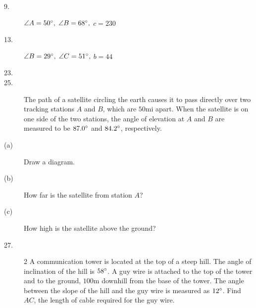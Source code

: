 \begin{description}
\item [9.] $\angle A =50 \mbox{{\ensuremath{{}^\circ}}}\text{,}$ $\angle B =68 \mbox{{\ensuremath{{}^\circ}}}\text{,}$ $c =230$ 

\item [13.] $\angle B =29 \mbox{{\ensuremath{{}^\circ}}}\text{,}$ $\angle C =51 \mbox{{\ensuremath{{}^\circ}}}\text{,}$ $b =44$ 

\item [23.]   
\columnsep =30pt
 

\item [25.]
The path of a satellite circling the earth causes it to pass directly over two tracking stations $A$ and $B$, which are $50 \mbox{mi}$ apart. When the satellite is on one side of the
two stations, the angle of elevation at $A$ and $B$ are measured to be $87.0 \mbox{{\ensuremath{{}^\circ}}}$ and $84.2 \mbox{{\ensuremath{{}^\circ}}}$, respectively. 

\item [(a)]
Draw a diagram. 

\item [(b)] How far is the satellite from
station $A$? 

\item [(c)] How high is the satellite
above the ground? 

\item [27.]   
\columnsep =30pt
\begin {multicols}{2}
 A communication tower is located at the top of a steep hill. The angle of inclination
of the hill is $58 \mbox{{\ensuremath{{}^\circ}}}$. A guy wire is attached to the top of the tower
and to the ground, $100 \mbox{m}$ downhill from the base of the tower. The
angle between the slope of the hill and the guy wire is measured as $12 \mbox{{\ensuremath{{}^\circ}}}$. Find $A C$, the length of cable required for the guy wire. 


\end{multicols}
\end{description}
